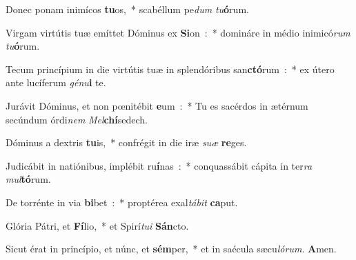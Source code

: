 \item Donec ponam inimícos \textbf{tu}os,~* scabéllum pe\emph{dum} \emph{tu}\textbf{ó}rum.
\item Virgam virtútis tuæ emíttet Dó\-minus ex \textbf{Si}\-on~:~* domináre in médio inimicó\emph{rum} \emph{tu}\textbf{ó}rum.
\item Tecum princípium in die virtútis tuæ in splendóribus san\textbf{ctó}\-rum~:~* ex útero ante lucíferum \emph{gé}\-\emph{nu}\-\textbf{i} te.
\item Jurávit Dóminus, et non pœnitébit \textbf{e}\-um~:~* Tu es sacérdos in ætérnum secúndum órdi\emph{nem} \emph{Mel}\textbf{chí}sedech.
\item Dóminus a dextris \textbf{tu}\-is,~* confrégit in die iræ \emph{su}\-\emph{æ} \textbf{re}ges.
\item Judicábit in natiónibus, implébit ru\textbf{í}\-nas~:~* conquassábit cápita in ter\emph{ra} \emph{mul}\textbf{tó}rum.
\item De torrénte in via \textbf{bi}\-bet~:~* proptérea exal\emph{tá}\-\emph{bit} \textbf{ca}put.
\item Glória Pátri, et \textbf{Fí}\-lio,~* et Spirí\emph{tu}\-\emph{i} \textbf{Sán}cto.
\item Sicut érat in princípio, et núnc, et \textbf{sém}\-per,~* et in saécula sæcu\emph{ló}\-\emph{rum}. \textbf{A}men.
